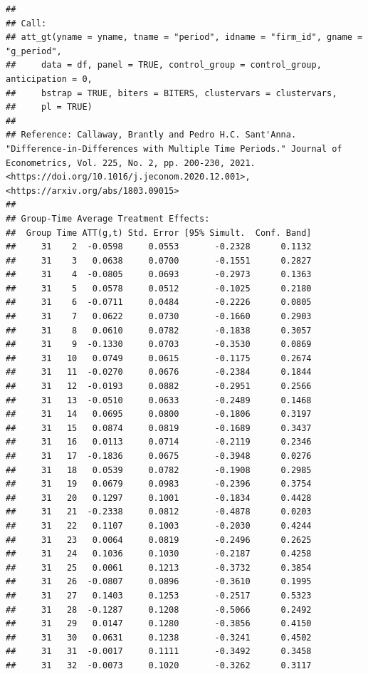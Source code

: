 \documentclass[
]{article}
\begin{document}
\begin{verbatim}
## 
## Call:
## att_gt(yname = yname, tname = "period", idname = "firm_id", gname = "g_period", 
##     data = df, panel = TRUE, control_group = control_group, anticipation = 0, 
##     bstrap = TRUE, biters = BITERS, clustervars = clustervars, 
##     pl = TRUE)
## 
## Reference: Callaway, Brantly and Pedro H.C. Sant'Anna.  "Difference-in-Differences with Multiple Time Periods." Journal of Econometrics, Vol. 225, No. 2, pp. 200-230, 2021. <https://doi.org/10.1016/j.jeconom.2020.12.001>, <https://arxiv.org/abs/1803.09015> 
## 
## Group-Time Average Treatment Effects:
##  Group Time ATT(g,t) Std. Error [95% Simult.  Conf. Band] 
##     31    2  -0.0598     0.0553       -0.2328      0.1132 
##     31    3   0.0638     0.0700       -0.1551      0.2827 
##     31    4  -0.0805     0.0693       -0.2973      0.1363 
##     31    5   0.0578     0.0512       -0.1025      0.2180 
##     31    6  -0.0711     0.0484       -0.2226      0.0805 
##     31    7   0.0622     0.0730       -0.1660      0.2903 
##     31    8   0.0610     0.0782       -0.1838      0.3057 
##     31    9  -0.1330     0.0703       -0.3530      0.0869 
##     31   10   0.0749     0.0615       -0.1175      0.2674 
##     31   11  -0.0270     0.0676       -0.2384      0.1844 
##     31   12  -0.0193     0.0882       -0.2951      0.2566 
##     31   13  -0.0510     0.0633       -0.2489      0.1468 
##     31   14   0.0695     0.0800       -0.1806      0.3197 
##     31   15   0.0874     0.0819       -0.1689      0.3437 
##     31   16   0.0113     0.0714       -0.2119      0.2346 
##     31   17  -0.1836     0.0675       -0.3948      0.0276 
##     31   18   0.0539     0.0782       -0.1908      0.2985 
##     31   19   0.0679     0.0983       -0.2396      0.3754 
##     31   20   0.1297     0.1001       -0.1834      0.4428 
##     31   21  -0.2338     0.0812       -0.4878      0.0203 
##     31   22   0.1107     0.1003       -0.2030      0.4244 
##     31   23   0.0064     0.0819       -0.2496      0.2625 
##     31   24   0.1036     0.1030       -0.2187      0.4258 
##     31   25   0.0061     0.1213       -0.3732      0.3854 
##     31   26  -0.0807     0.0896       -0.3610      0.1995 
##     31   27   0.1403     0.1253       -0.2517      0.5323 
##     31   28  -0.1287     0.1208       -0.5066      0.2492 
##     31   29   0.0147     0.1280       -0.3856      0.4150 
##     31   30   0.0631     0.1238       -0.3241      0.4502 
##     31   31  -0.0017     0.1111       -0.3492      0.3458 
##     31   32  -0.0073     0.1020       -0.3262      0.3117 

\end{verbatim}
\end{document}
